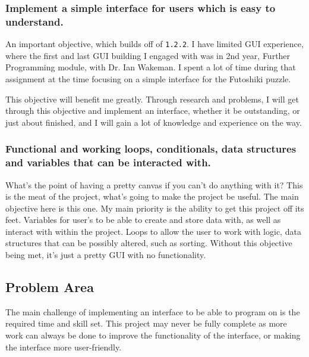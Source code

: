 \documentclass[a4paper, 12pt]{article}
\begin{document}
            \subsubsection{Implement a simple interface for users which is easy to
            understand.}
                An important objective, which builds off of \texttt{1.2.2}. I have limited GUI
                experience, where the first and last GUI building I engaged with was in 2nd year,
                Further Programming module, with Dr. Ian Wakeman. I spent a lot of time during that
                assignment at the time focusing on a simple interface for the Futoshiki puzzle.

                This objective will benefit me greatly. Through research and problems, I will
                get through this objective and implement an interface, whether it be outstanding,
                or just about finished, and I will gain a lot of knowledge and experience on
                the way.

            \subsubsection{Functional and working loops, conditionals, data structures and
            variables that can be interacted with.}
                What's the point of having a pretty canvas if you can't do anything with it?
                This is the meat of the project, what's going to make the project be useful.
                The main objective here is this one. My main priority is the ability to get
                this project off its feet.
                Variables for user's to be able to create and store data with, as well as
                interact with within the project. Loops to allow the user to work with logic,
                data structures that can be possibly altered, such as sorting. Without this
                objective being met, it's just a pretty GUI with no functionality.

        \subsection{Problem Area}
            The main challenge of implementing an interface to be able to program on is the required 
            time and skill set. This project may never be fully complete as more work can always be 
            done to improve the functionality of the interface, or making the interface more user-friendly.
\end{document}
